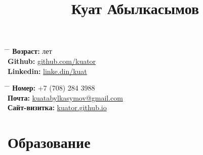 \documentclass[10pt]{article} %
\begin{document}

\title{Куат Абылкасымов} %


\parbox{0.5\textwidth}{ %
\begin{tabbing} %
\hspace{3cm} \= \hspace{4cm} \= \kill %
{\bf Возраст: }  лет \\ %
{\bf Github:} \> \href{https://www.github.com/kuator}{github.com/kuator} \\ %
{\bf Linkedin:} \> \href{https://www.linkedin.com/in/kuat-abylkassymov-273bb2177/}{linke.din/kuat} \\ %
\end{tabbing}}
\hfill %
\parbox{0.5\textwidth}{ %
\begin{tabbing} %
\hspace{3cm} \= \hspace{4cm} \= \kill %
{\bf Номер: } \> +7 (708) 284 3988 \\ %
{\bf Почта: } \> \href{mailto:kuatabylkasymov@gmail.com}{kuatabylkasymov@gmail.com} \\ %
{\bf Сайт-визитка: } \> \href{https://kuator.github.io}{kuator.github.io} \\ %
\end{tabbing}}


\section{Образование}

\end{document}

